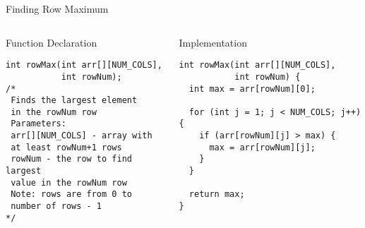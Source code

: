 \documentclass{beamer}
\begin{document}
\begin{frame}{Finding Row Maximum}
    \begin{columns}
        \begin{column}{0.48\textwidth}
            \begin{block}{Function Declaration}
                \begin{lstlisting}[basicstyle=\ttfamily\footnotesize]
int rowMax(int arr[][NUM_COLS], 
           int rowNum);
/*
 Finds the largest element 
 in the rowNum row
 Parameters:
 arr[][NUM_COLS] - array with 
 at least rowNum+1 rows
 rowNum - the row to find largest
 value in the rowNum row
 Note: rows are from 0 to 
 number of rows - 1
*/
                \end{lstlisting}
            \end{block}
        \end{column}
        \begin{column}{0.48\textwidth}
            \begin{block}{Implementation}
                \begin{lstlisting}[basicstyle=\ttfamily\footnotesize]
int rowMax(int arr[][NUM_COLS], 
           int rowNum) {
  int max = arr[rowNum][0];
  
  for (int j = 1; j < NUM_COLS; j++) {
    if (arr[rowNum][j] > max) {
      max = arr[rowNum][j];
    }
  }
  
  return max;
}
                \end{lstlisting}
            \end{block}
        \end{column}
    \end{columns}
\end{frame}
\end{document}
